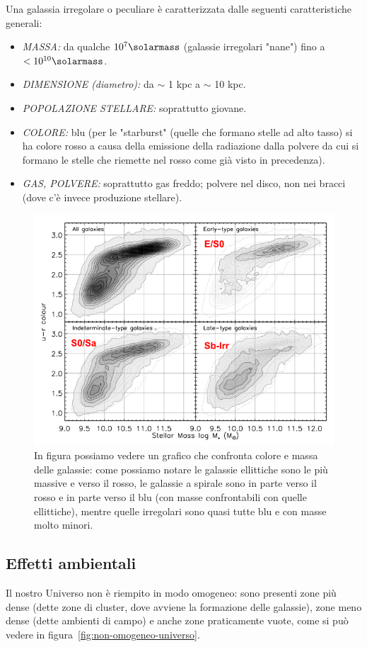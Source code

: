 Una galassia irregolare o peculiare è caratterizzata dalle seguenti caratteristiche generali:

\begin{itemize}
	\item \emph{MASSA:} da qualche $10^7 \si{\solarmass}$ (galassie irregolari "nane") fino a $< 10^{10} \si{\solarmass}$.
	\item \emph{DIMENSIONE (diametro):} da $\sim$ 1 kpc a $\sim$ 10 kpc.
	\item \emph{POPOLAZIONE STELLARE:} soprattutto giovane.
	\item \emph{COLORE:} blu (per le "starburst" (quelle che formano stelle ad alto tasso) si ha colore rosso a causa della emissione della radiazione dalla polvere da cui si formano le stelle che riemette nel rosso come già visto in precedenza).
	\item \emph{GAS, POLVERE:} soprattutto gas freddo; polvere nel disco, non nei bracci (dove c'è invece produzione stellare).
\end{itemize}

\begin{figure}
	\centering
	\includegraphics[width = 0.6 \textwidth ]{immagini/galassie-colore-massa-stellare.png}
	\caption{In figura possiamo vedere un grafico che confronta colore e massa delle galassie: come possiamo notare le galassie ellittiche sono le più massive e verso il rosso, le galassie a spirale sono in parte verso il rosso e in parte verso il blu (con masse confrontabili con quelle ellittiche), mentre quelle irregolari sono quasi tutte blu e con masse molto minori.}
	\label{fig:galassie-colore-massastellare}
\end{figure}
\subsection{Effetti ambientali}
Il nostro Universo non è riempito in modo omogeneo: sono presenti zone più dense (dette zone di cluster, dove avviene la formazione delle galassie), zone meno dense (dette ambienti di campo) e anche zone praticamente vuote, come si può vedere in figura~\ref{fig:non-omogeneo-universo}.

